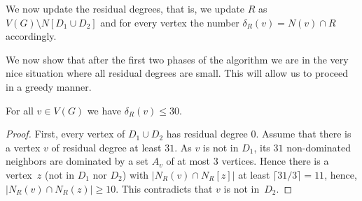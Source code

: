 We now update the residual degrees, that is, we update $R$ as
$V(G)\setminus N[D_1\cup D_2]$ and for every vertex the number
$\delta_R(v)=N(v)\cap R$ accordingly.


We now show that after the first two phases of the algorithm we
are in the very nice situation where all residual degrees are
small. This will allow us to proceed in a greedy manner.

\begin{lemma}\label{lem:res-degree}
  For all $v\in V(G)$ we have $\delta_R(v)\leq 30$.
\end{lemma}
\begin{proof}
  First, every vertex of $D_1\cup D_2$ has residual degree $0$.
  Assume that there is a vertex $v$ of residual degree at least $31$.
  As $v$ is not in $D_1$, its $31$ non-dominated neighbors are
  dominated by a set $A_v$ of at most 3 vertices. Hence there is a
  vertex~$z$ (not in $D_1$ nor $D_2$) with $|N_R(v)\cap N_R[z]|$ at least
  $\lceil 31/3\rceil = 11$, hence, $|N_R(v)\cap N_R(z)|\geq 10$.
  This contradicts that $v$ is not in~$D_2$.
\end{proof}
